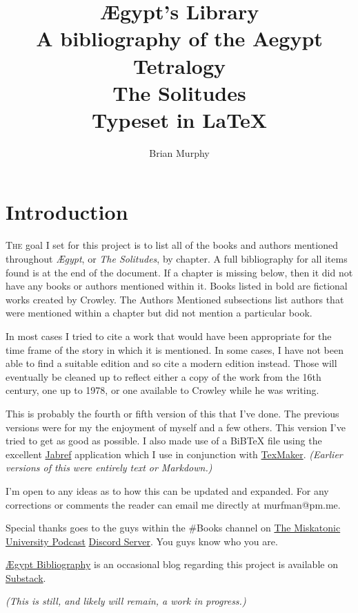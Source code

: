 \documentclass[12pt,makeidx]{extreport}
\author{Brian Murphy}
\title{
 {\Huge Ægypt's Library} \\
 {\footnotesize A bibliography of the Aegypt Tetralogy \\
 \bigskip
 {\Large The Solitudes} \\
 \bigskip
 Typeset in \LaTeX{} \\
 }
}
\date{\begin{small}\today{}\end{small}}
\newcommand\dropcap{\lettrine[lines=4, findent=3pt]}
\newcommand\fleuron{\begin{turn}{45}\Large \ding{166}\end{turn}}
\newcommand\doublefleuron{%
	\reflectbox{\fleuron}\AC\staveXLIX\reflectbox{\AC}\fleuron}
\newcommand\fleuronbar{%
	{\huge\LinearACCCXIII}\xrfill[1.3ex]{1pt}\doublefleuron\xrfill[1.3ex]{1pt}\reflectbox{\huge\LinearACCCXIII}}
\newcommand\blankpage{%
    \null
    \thispagestyle{empty}%
    \addtocounter{page}{-1}%
    \newpage%
    \pagestyle{fancy}}
\newcommand\nbvspace[1][3]{\vspace*{\stretch{#1}}}
\begin{document}
%



\setcounter{tocdepth}{2}
\tableofcontents
\pagestyle{fancy}

\accanthis
\pagestyle{fancy}
\chapter{Introduction}
\dropcap{T}{he} goal I set for this project is to list all of the books and authors mentioned throughout \textit{Ægypt}, or \textit{The Solitudes}, by chapter. A full bibliography for all items found is at the end of the document. If a chapter is missing below, then it did not have any books or authors mentioned within it. Books listed in bold are fictional works created by Crowley. The Authors Mentioned subsections list authors that were mentioned within a chapter but did not mention a particular book.

In most cases I tried to cite a work that would have been appropriate for the time frame of the story in which it is mentioned. In some cases, I have not been able to find a suitable edition and so cite a modern edition instead. Those will eventually be cleaned up to reflect either a copy of the work from the 16th century, one up to 1978, or one available to Crowley while he was writing.

This is probably the fourth or fifth version of this that I've done. The previous versions were for my the enjoyment of myself and a few others. This version I've tried to get as good as possible. I also made use of a {BiBTeX} file using the excellent \href{https://www.jabref.org/}{Jabref} application which I use in conjunction with \href{https://www.xm1math.net/texmaker/}{TexMaker}. \textit{(Earlier versions of this were entirely text or Markdown.)} 

I'm open to any ideas as to how this can be updated and expanded. For any corrections or comments the reader can email me directly at murfman@pm.me.

Special thanks goes to the guys within the \#Books channel on \href{https://www.mu-podcast.com}{The Miskatonic University Podcast} \href{https://discord.gg/5nH7UqtpdM}{Discord Server}. You guys know who you are.

\href{https://aegyptbibliography.substack.com}{Ægypt Bibliography} is an occasional blog regarding this project is available on \href{www.substack.com}{Substack}.
\bigskip
\begin{center}
\textit{(This is still, and likely will remain, a work in progress.)}

\vfill
\shadowoffset{1pt}
\shadowtext{%
{\color{Mahogany}\fontsize{64}{64}\Venus}}\\
\nbvspace[1]
\end{center}
\end{document}
